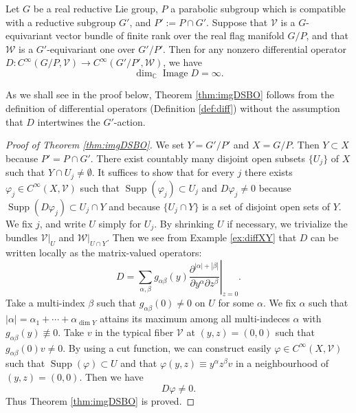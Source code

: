 \begin{theorem}
\label{thm:imgDSBO}
Let $G$ be a real reductive Lie group,
 $P$ a parabolic subgroup 
 which is compatible with a reductive subgroup $G'$, 
 and $P' := P \cap G'$.  
Suppose that ${\mathcal{V}}$ is a $G$-equivariant vector bundle
 of finite rank over the real flag manifold $G/P$, 
and that ${\mathcal{W}}$ is a $G'$-equivariant one over $G'/P'$.  
Then for any nonzero differential operator
 $D \colon C^{\infty}(G/P,{\mathcal{V}}) \to C^{\infty}(G'/P',{\mathcal{W}})$, 
 we have 
\[
  \dim_{\mathbb{C}} {\operatorname{Image}} D= \infty.  
\]
\end{theorem}
As we shall see
 in the proof below,
Theorem \ref{thm:imgDSBO}
 follows from the definition
of differential operators (Definition \ref{def:diff})
 without the assumption
 that $D$ intertwines the $G'$-action.  

\begin{proof}
[Proof of Theorem \ref{thm:imgDSBO}]
We set $Y=G'/P'$ and $X=G/P$.  
Then $Y \subset X$ because $P' = P \cap G'$.  
There exist countably many disjoint open subsets $\{U_j\}$ of $X$
 such that $Y \cap U_j \ne \emptyset$.  
It suffices to show
 that for every $j$ there exists $\varphi_j \in C^{\infty}(X,{\mathcal{V}})$
 such that ${\operatorname{Supp}} (\varphi_j) \subset U_j$
 and $D \varphi_j \ne 0$
 because ${\operatorname{Supp}} (D \varphi_j) \subset U_j \cap Y$
 and because $\{U_j \cap Y\}$ is a set of disjoint open sets of $Y$.  
We fix $j$, 
 and write $U$ simply for $U_j$.  
By shrinking $U$ if necessary,
 we trivialize the bundles ${\mathcal{V}}|_U$ and ${\mathcal{W}}|_{U \cap Y}$.  Then we see from Example \ref{ex:diffXY}
 that $D$ can be written locally as the matrix-valued operators:
\[
   D=\sum_{\alpha,\beta} g_{\alpha \beta} (y)
     \left. 
     \frac{\partial^{|\alpha|+|\beta|}}{\partial y ^{\alpha}\partial z^{\beta}}
     \right|_{z=0}.  
\]
Take a multi-index $\beta$
 such that $g_{\alpha \beta} (0) \ne 0$
 on $U$ for some $\alpha$.  
We fix $\alpha$ such that $|\alpha|=\alpha_1+ \cdots +\alpha_{\dim Y}$
attains its maximum 
 among all multi-indeces $\alpha$ with $g_{\alpha \beta} (y) \not \equiv 0$.  
Take $v$ in the typical fiber ${\mathcal{V}}$ at $(y, z)=(0,0)$
 such that $g_{\alpha \beta}(0) v \ne 0$.  
By using a cut function,
 we can construct easily $\varphi \in C^{\infty}(X, {\mathcal{V}})$ 
 such that ${\operatorname{Supp}}(\varphi) \subset U$
 and that $\varphi(y,z) \equiv y^{\alpha} z^{\beta} v$
 in a neighbourhood of $(y,z)=(0,0)$.  
Then we have 
\[
  D \varphi \ne 0.  
\]
Thus Theorem \ref{thm:imgDSBO} is proved.  
\end{proof}


